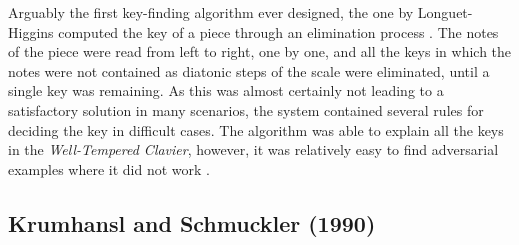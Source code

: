 Arguably the first key-finding algorithm ever designed, the one by Longuet-Higgins computed the key of a piece through an elimination process \cite{longuet-higgins_interpreting_1971}. The notes of the piece were read from left to right, one by one, and all the keys in which the notes were not contained as diatonic steps of the scale were eliminated, until a single key was remaining. As this was almost certainly not leading to a satisfactory solution in many scenarios, the system contained several rules for deciding the key in difficult cases. The algorithm was able to explain all the keys in the \emph{Well-Tempered Clavier}, however, it was relatively easy to find adversarial examples where it did not work \cite{temperley_pitch-class_2008}.

\subsection{Krumhansl and Schmuckler (1990)}

